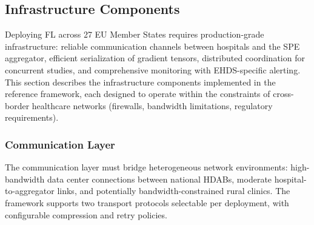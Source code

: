\documentclass[conference]{IEEEtran}
\begin{document}
\subsection{Infrastructure Components}
\label{sec:infrastructure}

Deploying FL across 27 EU Member States requires production-grade infrastructure: reliable communication channels between hospitals and the SPE aggregator, efficient serialization of gradient tensors, distributed coordination for concurrent studies, and comprehensive monitoring with EHDS-specific alerting. This section describes the infrastructure components implemented in the reference framework, each designed to operate within the constraints of cross-border healthcare networks (firewalls, bandwidth limitations, regulatory requirements).

\subsubsection{Communication Layer}

The communication layer must bridge heterogeneous network environments: high-bandwidth data center connections between national HDABs, moderate hospital-to-aggregator links, and potentially bandwidth-constrained rural clinics. The framework supports two transport protocols selectable per deployment, with configurable compression and retry policies.

\begin{figure}[htbp]
\centering
{}
\end{figure}
\end{document}
